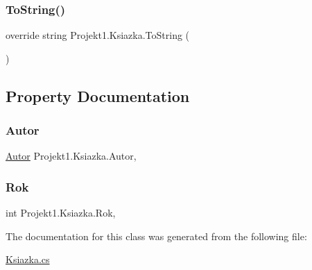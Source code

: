 \subsubsection{\texorpdfstring{ToString()}{ToString()}}
{\footnotesize\ttfamily override string Projekt1.\+Ksiazka.\+To\+String (\begin{DoxyParamCaption}{ }\end{DoxyParamCaption})}



\subsection{Property Documentation}
\mbox{\label{class_projekt1_1_1_ksiazka_a1cfd38a68b3df3433d79869c032052a2}} 
\subsubsection{\texorpdfstring{Autor}{Autor}}
{\footnotesize\ttfamily \mbox{\hyperlink{class_projekt1_1_1_autor}{Autor}} Projekt1.\+Ksiazka.\+Autor\hspace{0.3cm}{\ttfamily [get]}, {}}

\mbox{\label{class_projekt1_1_1_ksiazka_ad80bf26ad51f93ea27152769ae52c91f}} 
\subsubsection{\texorpdfstring{Rok}{Rok}}
{\footnotesize\ttfamily int Projekt1.\+Ksiazka.\+Rok\hspace{0.3cm}{\ttfamily [get]}, {}}



The documentation for this class was generated from the following file\+:\begin{DoxyCompactItemize}
\item 
\mbox{\hyperlink{_ksiazka_8cs}{Ksiazka.\+cs}}\end{DoxyCompactItemize}
